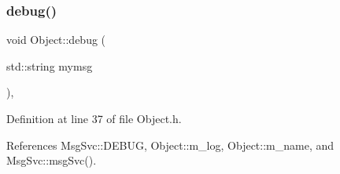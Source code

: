 \subsubsection{\texorpdfstring{debug()}{debug()}\hspace{0.1cm}{\footnotesize\ttfamily [1/2]}}
{\footnotesize\ttfamily void Object\+::debug (\begin{DoxyParamCaption}\item[{std\+::string}]{mymsg }\end{DoxyParamCaption})\hspace{0.3cm}{\ttfamily [inline]}, {\ttfamily [inherited]}}



Definition at line 37 of file Object.\+h.



References Msg\+Svc\+::\+D\+E\+B\+UG, Object\+::m\+\_\+log, Object\+::m\+\_\+name, and Msg\+Svc\+::msg\+Svc().



